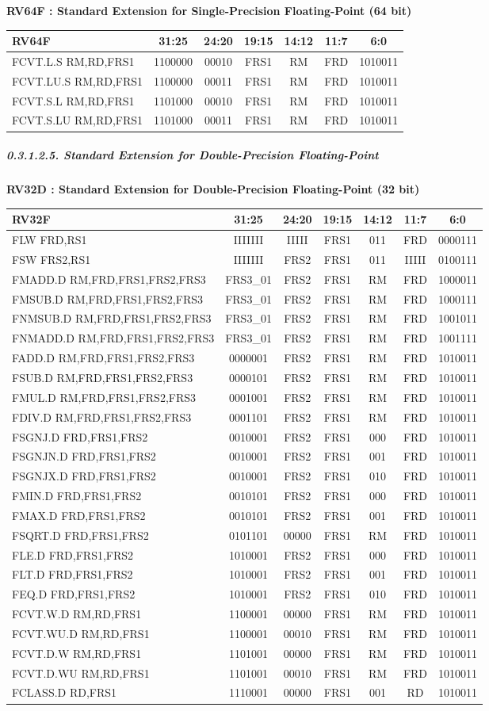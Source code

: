 \documentclass[
]{article}
\begin{document}
\textbf{RV64F : Standard Extension for Single-Precision Floating-Point
(64 bit)}

\begin{longtable}[]{@{}lcccccc@{}}
\toprule
RV64F & 31:25 & 24:20 & 19:15 & 14:12 & 11:7 & 6:0\tabularnewline
\midrule
\endhead
FCVT.L.S RM,RD,FRS1 & 1100000 & 00010 & FRS1 & RM & FRD &
1010011\tabularnewline
FCVT.LU.S RM,RD,FRS1 & 1100000 & 00011 & FRS1 & RM & FRD &
1010011\tabularnewline
FCVT.S.L RM,RD,FRS1 & 1101000 & 00010 & FRS1 & RM & FRD &
1010011\tabularnewline
FCVT.S.LU RM,RD,FRS1 & 1101000 & 00011 & FRS1 & RM & FRD &
1010011\tabularnewline
\bottomrule
\end{longtable}

\hypertarget{standard-extension-for-double-precision-floating-point}{%
\subparagraph{0.3.1.2.5. Standard Extension for Double-Precision
Floating-Point}\label{standard-extension-for-double-precision-floating-point}}

\textbf{RV32D : Standard Extension for Double-Precision Floating-Point
(32 bit)}

\begin{longtable}[]{@{}lcccccc@{}}
\toprule
RV32F & 31:25 & 24:20 & 19:15 & 14:12 & 11:7 & 6:0\tabularnewline
\midrule
\endhead
FLW FRD,RS1 & IIIIIII & IIIII & FRS1 & 011 & FRD &
0000111\tabularnewline
FSW FRS2,RS1 & IIIIIII & FRS2 & FRS1 & 011 & IIIII &
0100111\tabularnewline
FMADD.D RM,FRD,FRS1,FRS2,FRS3 & FRS3\_01 & FRS2 & FRS1 & RM & FRD &
1000011\tabularnewline
FMSUB.D RM,FRD,FRS1,FRS2,FRS3 & FRS3\_01 & FRS2 & FRS1 & RM & FRD &
1000111\tabularnewline
FNMSUB.D RM,FRD,FRS1,FRS2,FRS3 & FRS3\_01 & FRS2 & FRS1 & RM & FRD &
1001011\tabularnewline
FNMADD.D RM,FRD,FRS1,FRS2,FRS3 & FRS3\_01 & FRS2 & FRS1 & RM & FRD &
1001111\tabularnewline
FADD.D RM,FRD,FRS1,FRS2,FRS3 & 0000001 & FRS2 & FRS1 & RM & FRD &
1010011\tabularnewline
FSUB.D RM,FRD,FRS1,FRS2,FRS3 & 0000101 & FRS2 & FRS1 & RM & FRD &
1010011\tabularnewline
FMUL.D RM,FRD,FRS1,FRS2,FRS3 & 0001001 & FRS2 & FRS1 & RM & FRD &
1010011\tabularnewline
FDIV.D RM,FRD,FRS1,FRS2,FRS3 & 0001101 & FRS2 & FRS1 & RM & FRD &
1010011\tabularnewline
FSGNJ.D FRD,FRS1,FRS2 & 0010001 & FRS2 & FRS1 & 000 & FRD &
1010011\tabularnewline
FSGNJN.D FRD,FRS1,FRS2 & 0010001 & FRS2 & FRS1 & 001 & FRD &
1010011\tabularnewline
FSGNJX.D FRD,FRS1,FRS2 & 0010001 & FRS2 & FRS1 & 010 & FRD &
1010011\tabularnewline
FMIN.D FRD,FRS1,FRS2 & 0010101 & FRS2 & FRS1 & 000 & FRD &
1010011\tabularnewline
FMAX.D FRD,FRS1,FRS2 & 0010101 & FRS2 & FRS1 & 001 & FRD &
1010011\tabularnewline
FSQRT.D FRD,FRS1,FRS2 & 0101101 & 00000 & FRS1 & RM & FRD &
1010011\tabularnewline
FLE.D FRD,FRS1,FRS2 & 1010001 & FRS2 & FRS1 & 000 & FRD &
1010011\tabularnewline
FLT.D FRD,FRS1,FRS2 & 1010001 & FRS2 & FRS1 & 001 & FRD &
1010011\tabularnewline
FEQ.D FRD,FRS1,FRS2 & 1010001 & FRS2 & FRS1 & 010 & FRD &
1010011\tabularnewline
FCVT.W.D RM,RD,FRS1 & 1100001 & 00000 & FRS1 & RM & FRD &
1010011\tabularnewline
FCVT.WU.D RM,RD,FRS1 & 1100001 & 00010 & FRS1 & RM & FRD &
1010011\tabularnewline
FCVT.D.W RM,RD,FRS1 & 1101001 & 00000 & FRS1 & RM & FRD &
1010011\tabularnewline
FCVT.D.WU RM,RD,FRS1 & 1101001 & 00010 & FRS1 & RM & FRD &
1010011\tabularnewline
FCLASS.D RD,FRS1 & 1110001 & 00000 & FRS1 & 001 & RD &
1010011\tabularnewline
\bottomrule
\end{longtable}
\end{document}
